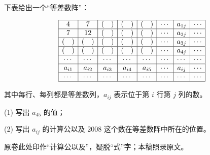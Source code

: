 \begin{question}
下表给出一个“等差数阵”：

\nopagebreak[4]
\[
\begin{array}{|c|c|c|c|c|c|c|c|}
\hline
4 & 7 & (\quad) & (\quad) & (\quad) & \cdots & a_{1j} & \cdots \\ \hline
7 & 12 & (\quad) & (\quad) & (\quad) & \cdots & a_{2j} & \cdots \\ \hline
(\quad) & (\quad) & (\quad) & (\quad) & (\quad) & \cdots & a_{3j} & \cdots \\ \hline
(\quad) & (\quad) & (\quad) & (\quad) & (\quad) & \cdots & a_{4j} & \cdots \\ \hline
\cdots & \cdots & \cdots & \cdots & \cdots & \cdots & \cdots & \cdots \\ \hline
a_{i1} & a_{i2} & a_{i3} & a_{i4} & a_{i5} & \cdots & a_{ij} & \cdots \\ \hline
\cdots & \cdots & \cdots & \cdots & \cdots & \cdots & \cdots & \cdots \\ \hline
\end{array}
\]

其中每行、每列都是等差数列，$a_{ij}$ 表示位于第 $i$ 行第 $j$ 列的数。

(1) 写出 $a_{45}$ 的值；

(2) 写出 $a_{ij}$ 的计算公以及 $2008$ 这个数在等差数阵中所在的位置。

\begin{gktip}
原卷此处印作“计算公以及”，疑脱“式”字；本稿照录原文。
\end{gktip}

\end{question}